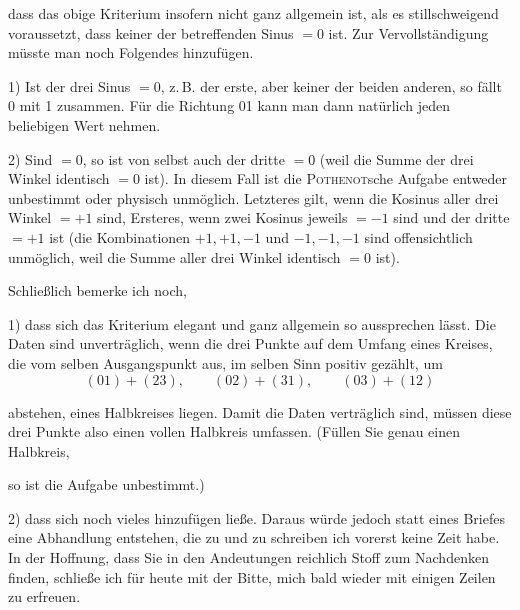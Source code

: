 %
dass das obige Kriterium insofern nicht ganz allgemein ist, als es stillschweigend voraussetzt, dass keiner der betreffenden Sinus $=0$ ist. Zur Vervollständigung müsste man noch Folgendes hinzufügen.

1) Ist  der drei Sinus $=0$, z.\,B. der erste, aber keiner der beiden anderen, so fällt 0 mit 1 zusammen. Für die Richtung 01 kann man dann natürlich jeden beliebigen Wert nehmen.

2) Sind  $=0$, so ist von selbst auch der dritte $=0$ (weil die Summe der drei Winkel identisch $=0$ ist). In diesem Fall ist die \textsc{Pothenot}sche Aufgabe entweder unbestimmt oder physisch unmöglich. Letzteres gilt, wenn die Kosinus aller drei Winkel $=+1$ sind, Ersteres, wenn zwei Kosinus jeweils $=-1$ sind und der dritte $=+1$ ist (die Kombinationen $+1,+1,-1$ und $-1,-1,-1$ sind offensichtlich unmöglich, weil die Summe aller drei Winkel identisch $=0$ ist).

Schließlich bemerke ich noch,

1) dass sich das Kriterium elegant und ganz allgemein so aussprechen lässt. Die Daten sind unverträglich, wenn die drei Punkte auf dem Umfang eines Kreises, die vom selben Ausgangspunkt aus, im selben Sinn positiv gezählt, um
\[
(01)+(23),\qquad (02)+(31),\qquad (03)+(12)
\]
\begin{minipage}{\linewidth}\raggedright\noindent abstehen,  eines Halbkreises liegen. Damit die Daten verträglich sind, müssen diese drei Punkte also  einen vollen Halb\-kreis umfassen. (Füllen Sie genau einen Halbkreis,

\begin{center}\end{center}

so ist die Aufgabe unbestimmt.)
\end{minipage}

2) dass sich noch vieles hinzufügen ließe. Daraus würde jedoch statt eines Briefes eine Abhandlung entstehen, die zu  und zu schreiben ich vorerst keine Zeit habe. In der Hoffnung, dass Sie in den Andeutungen reichlich Stoff zum Nachdenken finden, schließe ich für heute mit der Bitte, mich bald wieder mit einigen Zeilen zu erfreuen.


